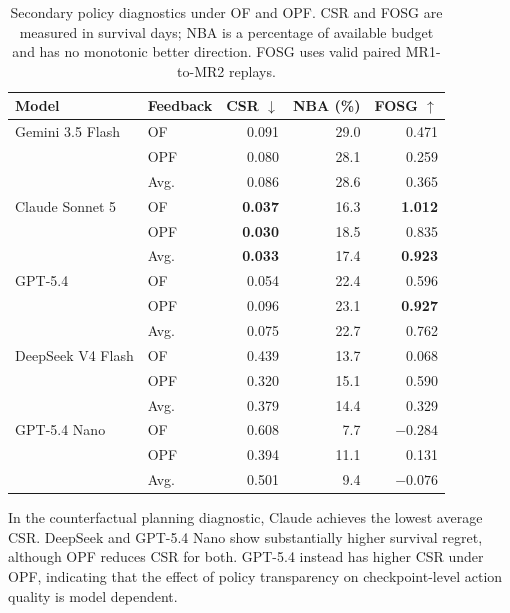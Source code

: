 \documentclass[letterpaper]{article} %
\begin{document}
\begin{table}[t]
    \centering
    \small
    \setlength{\tabcolsep}{3.2pt}
    \caption{Secondary policy diagnostics under OF and OPF. CSR and
    FOSG are measured in survival days; NBA is a percentage of available
    budget and has no monotonic better direction. FOSG uses valid paired
    MR1-to-MR2 replays.}
    \label{tab:capability-diagnostics}
    \begin{tabular}{llrrr}
        \toprule
        Model & Feedback & CSR $\downarrow$ & NBA (\%) & FOSG $\uparrow$ \\
        \midrule
        Gemini 3.5 Flash
            & OF  & 0.091 & 29.0 & 0.471 \\
            & OPF & 0.080 & 28.1 & 0.259 \\
            & Avg. & 0.086 & 28.6 & 0.365 \\
        \addlinespace
        Claude Sonnet 5
            & OF  & \textbf{0.037} & 16.3 & \textbf{1.012} \\
            & OPF & \textbf{0.030} & 18.5 & 0.835 \\
            & Avg. & \textbf{0.033} & 17.4 & \textbf{0.923} \\
        \addlinespace
        GPT-5.4
            & OF  & 0.054 & 22.4 & 0.596 \\
            & OPF & 0.096 & 23.1 & \textbf{0.927} \\
            & Avg. & 0.075 & 22.7 & 0.762 \\
        \addlinespace
        DeepSeek V4 Flash
            & OF  & 0.439 & 13.7 & 0.068 \\
            & OPF & 0.320 & 15.1 & 0.590 \\
            & Avg. & 0.379 & 14.4 & 0.329 \\
        \addlinespace
        GPT-5.4 Nano
            & OF  & 0.608 & 7.7 & $-0.284$ \\
            & OPF & 0.394 & 11.1 & 0.131 \\
            & Avg. & 0.501 & 9.4 & $-0.076$ \\
        \bottomrule
    \end{tabular}
\end{table}

In the counterfactual planning diagnostic, Claude achieves the lowest average CSR. DeepSeek
and GPT-5.4 Nano show substantially higher survival regret, although OPF
reduces CSR for both. GPT-5.4 instead has higher CSR under OPF, indicating
that the effect of policy transparency on checkpoint-level action quality
is model dependent.
\end{document}
